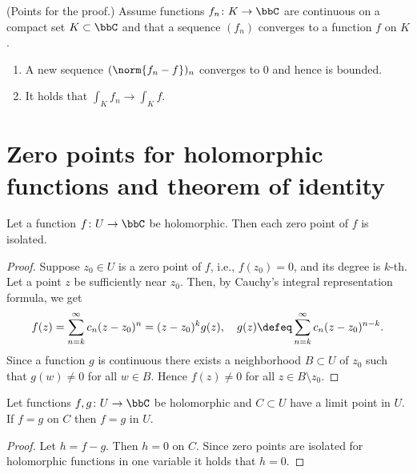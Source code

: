 \documentclass[openany, a4paper, oneside]{jsbook}
\begin{document}
\begin{rem}\textup{(Points for the proof.)}
Assume functions $f_n \colon K \to \bbC$ are continuous on a compact set $K \subset \bbC$
and that a sequence $(f_n)$ converges to a function $f$ on $K$.
\begin{enumerate}
\item A new sequence $(\norm{f_n -f })_n$ converges to 0 and hence is bounded.
\item It holds that $\int_K f_n \to \int_K f$.
\end{enumerate}
\end{rem}
\section{Zero points for holomorphic functions and theorem of identity}

\begin{thm}
 Let a function $f \colon U \to \bbC$ be holomorphic.
 Then each zero point of $f$ is isolated.
\end{thm}
\begin{proof}
Suppose $z_0 \in U$ is a zero point of $f$, i.e., $f (z_0) = 0$, and its degree is $k$-th.
Let a point $z$ be sufficiently near $z_0$.
Then, by Cauchy's integral representation formula, we get
\begin{align}
 f (z)
 =
 \sum_{n=k}^{\infty} c_n (z - z_0)^n
 =
 (z - z_0)^k g (z), \quad g (z) \defeq \sum_{n=k}^{\infty} c_n (z-z_0)^{n-k}.
\end{align}
Since a function $g$ is continuous there exists a neighborhood $B \subset U$ of $z_0$ such that $g (w) \neq 0$ for all $w \in B$.
Hence $f (z) \neq 0$ for all $z \in B \setminus {z_0}$.
\end{proof}
\begin{thm}
 Let functions $f, g \colon U \to \bbC$ be holomorphic and $C \subset U$ have a limit point in $U$.
 If $f = g$ on $C$ then $f=g$ in $U$.
\end{thm}
\begin{proof}
 Let $h = f - g$.
 Then $h = 0$ on $C$.
 Since zero points are isolated for holomorphic functions in one variable it holds that $h = 0$.
\end{proof}
\end{document}
